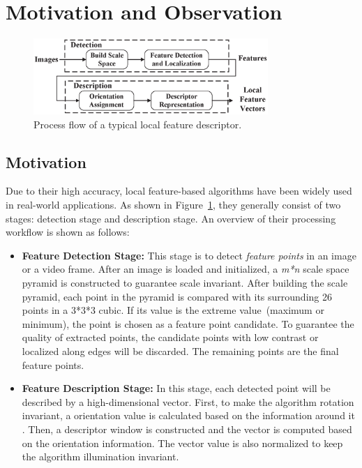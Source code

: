\section{Motivation and Observation}
\label{sec:observation}

\begin{figure}
	\centering
	\includegraphics[width=3.5in]{images/fig-workflow.eps}
	\caption{Process flow of a typical local feature descriptor.}
	\label{fig:workflow}
\end{figure}

\subsection{Motivation}

Due to their high accuracy, local feature-based algorithms have been widely used in real-world applications.  As shown in Figure~\ref{fig:workflow}, they generally consist of two stages: detection stage and description stage.  An overview of their processing workflow is shown as follows:

\begin{itemize}
\setlength{\itemsep}{0mm}


\item \textbf{Feature Detection Stage:} This stage is to detect \emph{feature points} in an image or a video frame. After an image is loaded and initialized, a \emph{m*n} scale space pyramid is constructed to guarantee scale invariant.  After building the scale pyramid, each point in the pyramid is compared with its
surrounding 26 points in a 3*3*3 cubic. If its value is the extreme value~(maximum or minimum), the point is chosen as a feature point candidate. To guarantee the quality of extracted points, the candidate points with low contrast or localized along edges will be discarded. The remaining points are the final feature points.

\item \textbf{Feature Description Stage:} In this stage, each detected point will be described by a high-dimensional vector. First, to make the algorithm rotation invariant, a orientation value is calculated based on the information around it . Then, a descriptor window is constructed and the vector is computed based on the orientation information. The vector value is also normalized to keep the algorithm illumination invariant.
\end{itemize}



